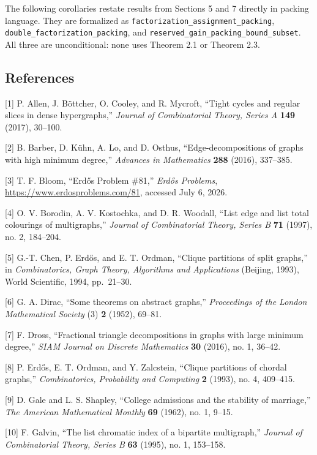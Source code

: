 \documentclass[english,11pt,a4paper]{article}
\newcounter{none}
\begin{document}
The following corollaries restate results from Sections 5 and 7 directly
in packing language. They are formalized as
\nolinkurl{factorization_assignment_packing},
\nolinkurl{double_factorization_packing}, and
\nolinkurl{reserved_gain_packing_bound_subset}. All three are
unconditional: none uses Theorem 2.1 or Theorem 2.3.

\subsection{References}\label{references}

{[}1{]} P. Allen, J. Böttcher, O. Cooley, and R. Mycroft, ``Tight cycles
and regular slices in dense hypergraphs,'' \emph{Journal of
Combinatorial Theory, Series A} \textbf{149} (2017), 30--100.

{[}2{]} B. Barber, D. Kühn, A. Lo, and D. Osthus, ``Edge-decompositions
of graphs with high minimum degree,'' \emph{Advances in Mathematics}
\textbf{288} (2016), 337--385.

{[}3{]} T. F. Bloom, ``Erdős Problem \#81,'' \emph{Erdős Problems},
\url{https://www.erdosproblems.com/81}, accessed July 6, 2026.

{[}4{]} O. V. Borodin, A. V. Kostochka, and D. R. Woodall, ``List edge
and list total colourings of multigraphs,'' \emph{Journal of
Combinatorial Theory, Series B} \textbf{71} (1997), no. 2, 184--204.

{[}5{]} G.-T. Chen, P. Erdős, and E. T. Ordman, ``Clique partitions of
split graphs,'' in \emph{Combinatorics, Graph Theory, Algorithms and
Applications} (Beijing, 1993), World Scientific, 1994, pp.~21--30.

{[}6{]} G. A. Dirac, ``Some theorems on abstract graphs,''
\emph{Proceedings of the London Mathematical Society} (3) \textbf{2}
(1952), 69--81.

{[}7{]} F. Dross, ``Fractional triangle decompositions in graphs with
large minimum degree,'' \emph{SIAM Journal on Discrete Mathematics}
\textbf{30} (2016), no. 1, 36--42.

{[}8{]} P. Erdős, E. T. Ordman, and Y. Zalcstein, ``Clique partitions of
chordal graphs,'' \emph{Combinatorics, Probability and Computing}
\textbf{2} (1993), no. 4, 409--415.

{[}9{]} D. Gale and L. S. Shapley, ``College admissions and the
stability of marriage,'' \emph{The American Mathematical Monthly}
\textbf{69} (1962), no. 1, 9--15.

{[}10{]} F. Galvin, ``The list chromatic index of a bipartite
multigraph,'' \emph{Journal of Combinatorial Theory, Series B}
\textbf{63} (1995), no. 1, 153--158.
\end{document}
